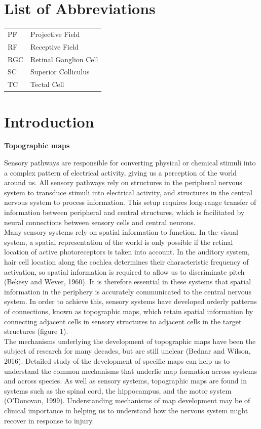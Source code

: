 \documentclass[11pt]{"article"}
\begin{document}
\section*{List of Abbreviations}

\begin{tabular}{ll}
PF & Projective Field \\
RF & Receptive Field \\
RGC & Retinal Ganglion Cell \\
SC & Superior Colliculus \\
TC & Tectal Cell \\
\end{tabular}


\section{Introduction}

\textbf{Topographic maps}

Sensory pathways are responsible for converting physical or chemical stimuli into a complex pattern of electrical activity, giving us a perception of the world around us. All sensory pathways rely on structures in the peripheral nervous system to transduce stimuli into electrical activity, and structures in the central nervous system to process information. This setup requires long-range transfer of information between peripheral and central structures, which is facilitated by neural connections between sensory cells and central neurons.  
\\

Many sensory systems rely on spatial information to function. In the visual system, a spatial representation of the world is only possible if the retinal location of active photoreceptors is taken into account. In the auditory system, hair cell location along the cochlea determines their characteristic frequency of activation, so spatial information is required to allow us to discriminate pitch (Bekesy and Wever, 1960). It is therefore essential in these systems that spatial information in the periphery is accurately communicated to the central nervous system. In order to achieve this, sensory systems have developed orderly patterns of connections, known as topographic maps, which retain spatial information by connecting adjacent cells in sensory structures to adjacent cells in the target structures (figure 1).
\\

The mechanisms underlying the development of topographic maps have been the subject of research for many decades, but are still unclear (Bednar and Wilson, 2016). Detailed study of the development of specific maps can help us to understand the common mechanisms that underlie map formation across systems and across species. As well as sensory systems, topographic maps are found in systems such as the spinal cord, the hippocampus, and the motor system (O'Donovan, 1999). Understanding mechanisms of map development may be of clinical importance in helping us to understand how the nervous system might recover in response to injury.
\\
\end{document}
